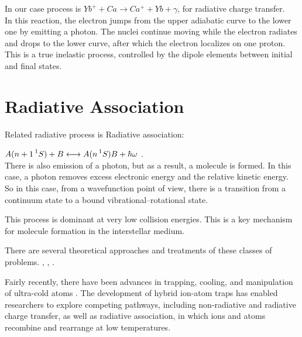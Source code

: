In our case process is $ Yb^+ + Ca \rightarrow Ca^{+} + Yb + \gamma $, for radiative charge transfer.\\

In this reaction, the electron jumps from the upper adiabatic curve to the lower one by emitting a photon.  The nuclei continue moving while the electron radiates and drops to the lower curve, after which the electron localizes on one proton.
This is a true inelastic process, controlled by the dipole elements between initial and final states.




\section{Radiative Association}

Related radiative process is Radiative association:

$ A(n+1\prescript{1}{}S) + B \longleftrightarrow A(n\prescript{1}{}S)B + \hbar\omega $ .\\

There is also emission of a photon, but as a result, a molecule is formed. In this case, a photon removes excess electronic energy and the relative kinetic energy. So in this case, from a wavefunction point of view, there is a transition from a continuum state to a bound vibrational–rotational state.

This process is dominant at very low collision energies. This is a key mechanism for molecule formation in the interstellar medium.

There are several theoretical approaches and treatments of these classes of problems. \cite{RadQuench1}, \cite{RadQuench2}, \cite{Zygelman88}.

Fairly recently, there have been advances in trapping, cooling, and manipulation of ultra-cold atoms \cite{C1CP21205B}. The development of hybrid ion-atom traps has enabled researchers to explore competing pathways, including non-radiative and radiative charge transfer, as well as radiative association, in which ions and atoms recombine and rearrange at low temperatures. 

